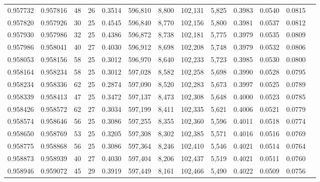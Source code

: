 \begin{tabular}{rrrrrrrrrrrrr}
0.957732 & 0.957816 &    48 &  26 &                                     0.3514 & 596,810 &   8,800 & 102,131 &   5,825 & 0.3983 & 0.0540 & 0.0815 \\
0.957820 & 0.957926 &    30 &  25 &                                     0.4545 & 596,840 &   8,770 & 102,156 &   5,800 & 0.3981 & 0.0537 & 0.0812 \\
0.957930 & 0.957986 &    32 &  25 &                                     0.4386 & 596,872 &   8,738 & 102,181 &   5,775 & 0.3979 & 0.0535 & 0.0809 \\
0.957986 & 0.958041 &    40 &  27 &                                     0.4030 & 596,912 &   8,698 & 102,208 &   5,748 & 0.3979 & 0.0532 & 0.0806 \\
0.958053 & 0.958156 &    58 &  25 &                                     0.3012 & 596,970 &   8,640 & 102,233 &   5,723 & 0.3985 & 0.0530 & 0.0800 \\
0.958164 & 0.958234 &    58 &  25 &                                     0.3012 & 597,028 &   8,582 & 102,258 &   5,698 & 0.3990 & 0.0528 & 0.0795 \\
0.958234 & 0.958336 &    62 &  25 &                                     0.2874 & 597,090 &   8,520 & 102,283 &   5,673 & 0.3997 & 0.0525 & 0.0789 \\
0.958339 & 0.958413 &    47 &  25 &                                     0.3472 & 597,137 &   8,473 & 102,308 &   5,648 & 0.4000 & 0.0523 & 0.0785 \\
0.958426 & 0.958572 &    62 &  27 &                                     0.3034 & 597,199 &   8,411 & 102,335 &   5,621 & 0.4006 & 0.0521 & 0.0779 \\
0.958574 & 0.958646 &    56 &  25 &                                     0.3086 & 597,255 &   8,355 & 102,360 &   5,596 & 0.4011 & 0.0518 & 0.0774 \\
0.958650 & 0.958769 &    53 &  25 &                                     0.3205 & 597,308 &   8,302 & 102,385 &   5,571 & 0.4016 & 0.0516 & 0.0769 \\
0.958775 & 0.958868 &    56 &  25 &                                     0.3086 & 597,364 &   8,246 & 102,410 &   5,546 & 0.4021 & 0.0514 & 0.0764 \\
0.958873 & 0.958939 &    40 &  27 &                                     0.4030 & 597,404 &   8,206 & 102,437 &   5,519 & 0.4021 & 0.0511 & 0.0760 \\
0.958946 & 0.959072 &    45 &  29 &                                     0.3919 & 597,449 &   8,161 & 102,466 &   5,490 & 0.4022 & 0.0509 & 0.0756 \\

\end{tabular}
